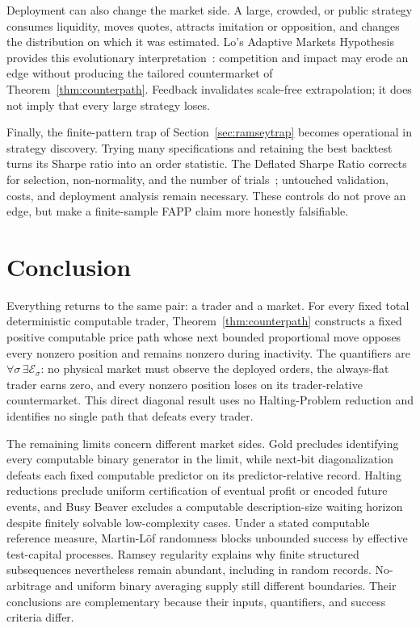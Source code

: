 \documentclass[aps,pra,reprint,superscriptaddress,amsmath,amssymb,floatfix]{revtex4-2}
\theoremstyle{plain}
\theoremstyle{definition}
\theoremstyle{remark}
\begin{document}
Deployment can also change the market side. A large, crowded, or public
strategy consumes liquidity, moves quotes, attracts imitation or opposition,
and changes the distribution on which it was estimated. Lo's Adaptive Markets
Hypothesis provides this evolutionary interpretation~\cite{Lo2004}: competition
and impact may erode an edge without producing the tailored countermarket of
Theorem~\ref{thm:counterpath}. Feedback invalidates scale-free extrapolation; it
does not imply that every large strategy loses.

Finally, the finite-pattern trap of Section~\ref{sec:ramseytrap} becomes
operational in strategy discovery. Trying many specifications and retaining the
best backtest turns its Sharpe ratio into an order statistic. The Deflated
Sharpe Ratio corrects for selection, non-normality, and the number of
trials~\cite{BaileyLopez2014}; untouched validation, costs, and deployment
analysis remain necessary. These controls do not prove an edge, but make a
finite-sample FAPP claim more honestly falsifiable.

\section{Conclusion}
\label{sec:conclusion}

Everything returns to the same pair: a trader and a market. For every fixed
total deterministic computable trader, Theorem~\ref{thm:counterpath} constructs
a fixed positive computable price path whose next bounded proportional move
opposes every nonzero position and remains nonzero during inactivity.
The quantifiers are
\(\forall\sigma\,\exists\mathcal E_\sigma\): no physical market must observe
the deployed orders, the always-flat trader earns zero, and every nonzero
position loses on its trader-relative countermarket. This direct diagonal
result uses no Halting-Problem reduction and identifies no single path that
defeats every trader.

The remaining limits concern different market sides. Gold precludes identifying
every computable binary generator in the limit, while next-bit diagonalization
defeats each fixed computable predictor on its predictor-relative record.
Halting reductions preclude uniform certification of eventual profit or encoded
future events, and Busy Beaver excludes a computable description-size waiting
horizon despite finitely solvable low-complexity cases. Under a stated
computable reference measure, Martin-L\"of randomness blocks unbounded success
by effective test-capital processes. Ramsey regularity explains why finite
structured subsequences nevertheless remain abundant, including in random
records. No-arbitrage and uniform binary averaging supply still different
boundaries. Their conclusions are complementary because their inputs,
quantifiers, and success criteria differ.
\end{document}
